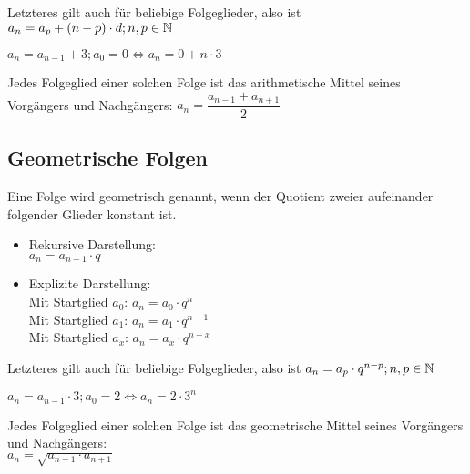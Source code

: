 \documentclass[../MAIN/main.tex]{subfiles}
\begin{document}
\begin{Bemerkung}
Letzteres gilt auch für beliebige Folgeglieder, also ist $a_{n}=a_{p}+(n-p)\cdot d;n,p\in\mathbb{N}$
\end{Bemerkung}

\begin{Beispiel}
$a_{n}=a_{n-1}+3;a_{0}=0\Leftrightarrow a_{n}=0+n\cdot3$
\end{Beispiel}

\begin{Bemerkung}
Jedes Folgeglied einer solchen Folge ist das arithmetische Mittel seines Vorgängers und Nachgängers: $a_{n}=\dfrac{a_{n-1}+a_{n+1}}{2}$
\end{Bemerkung}

	\subsection{Geometrische Folgen}

\begin{Definition}
Eine Folge wird geometrisch genannt, wenn der Quotient zweier aufeinander folgender Glieder konstant ist.
\begin{itemize}
\item Rekursive Darstellung:\\
\indent $a_{n}=a_{n-1}\cdot q$
\item Explizite Darstellung:\\
\indent Mit Startglied $a_{0}$: $a_{n}=a_{0}\cdot q^n$\\
\indent Mit Startglied $a_{1}$: $a_{n}=a_{1}\cdot q^{n-1}$\\
\indent Mit Startglied $a_{x}$: $a_{n}=a_{x}\cdot q^{n-x}$\\
\end{itemize}
\end{Definition}

\begin{Bemerkung}
Letzteres gilt auch für beliebige Folgeglieder, also ist $a_{n}=a_{p}\cdot q^{n-p};n,p\in\mathbb{N}$
\end{Bemerkung}

\begin{Beispiel}
$a_{n}=a_{n-1}\cdot3;a_{0}=2\Leftrightarrow a_{n}=2\cdot3^n$
\end{Beispiel}

\begin{Bemerkung}
Jedes Folgeglied einer solchen Folge ist das geometrische Mittel seines Vorgängers und Nachgängers:\\
 $a_{n}=\sqrt{a_{n-1}\cdot a_{n+1}}$
\end{Bemerkung}
\end{document}
